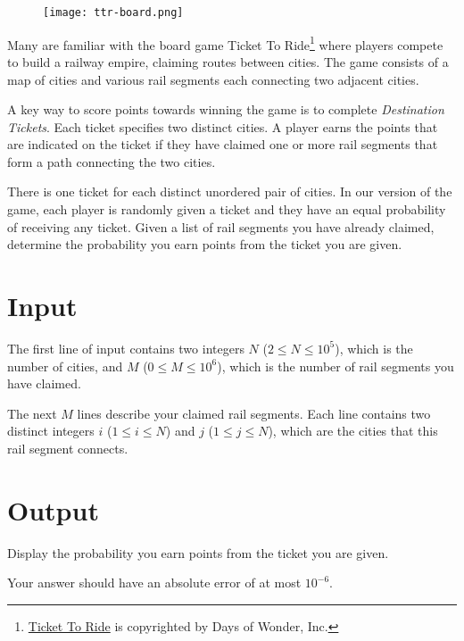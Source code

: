 
\begin{figure}[h]
\begin{center}
 \texttt{[image: ttr-board.png]}
\end{center}
\end{figure}

Many are familiar with the board game Ticket To 
Ride\footnote{\href{https://www.daysofwonder.com/tickettoride/en/}{Ticket To 
 Ride} is copyrighted by Days of Wonder, Inc.}
where
players compete to build a railway empire, claiming routes between cities.
The game consists of a map of cities and various rail segments each connecting
two adjacent cities. 

A key way to score points towards winning the game is to complete
\textit{Destination Tickets}.  Each ticket specifies two distinct cities. A
player earns the points that are indicated on the ticket if they have claimed
one or more rail segments that form a path connecting the two cities.

There is one ticket for each distinct unordered pair of cities. In our
version of the game, each player is randomly given a ticket and they have
an equal probability of receiving any ticket. Given a list of rail segments
you have already claimed, determine the probability you earn points from the ticket you
are given.

\section*{Input}
The first line of input contains two integers $N$ ($2 \leq N \leq 10^5$), which is
the number of cities, and $M$ ($0 \leq M \leq 10^6$), which is the number of rail
segments you have claimed.

The next $M$ lines describe your claimed rail segments. Each line contains two
distinct integers $i$ ($1 \leq i \leq N$) and $j$ ($1 \leq j \leq N$), which are
the cities that this rail segment connects.

\section*{Output}
Display the probability you earn points from the ticket you are given.

Your answer should have an absolute error of at most $10^{-6}$.
